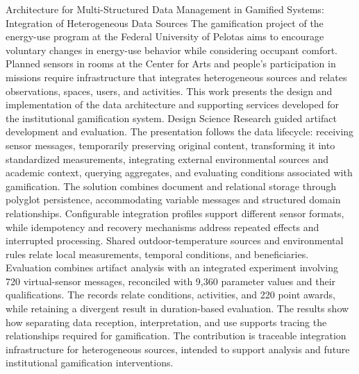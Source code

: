 \documentclass[tcc,capa]{texufpel}
\begin{document}
\begin{englishabstract}{Architecture for Multi-Structured Data Management in Gamified Systems: Integration of Heterogeneous Data Sources}
The gamification project of the energy-use program at the Federal University of Pelotas aims to encourage voluntary changes in energy-use behavior while considering occupant comfort. Planned sensors in rooms at the Center for Arts and people's participation in missions require infrastructure that integrates heterogeneous sources and relates observations, spaces, users, and activities. This work presents the design and implementation of the data architecture and supporting services developed for the institutional gamification system. Design Science Research guided artifact development and evaluation. The presentation follows the data lifecycle: receiving sensor messages, temporarily preserving original content, transforming it into standardized measurements, integrating external environmental sources and academic context, querying aggregates, and evaluating conditions associated with gamification. The solution combines document and relational storage through polyglot persistence, accommodating variable messages and structured domain relationships. Configurable integration profiles support different sensor formats, while idempotency and recovery mechanisms address repeated effects and interrupted processing. Shared outdoor-temperature sources and environmental rules relate local measurements, temporal conditions, and beneficiaries. Evaluation combines artifact analysis with an integrated experiment involving 720 virtual-sensor messages, reconciled with 9,360 parameter values and their qualifications. The records relate conditions, activities, and 220 point awards, while retaining a divergent result in duration-based evaluation. The results show how separating data reception, interpretation, and use supports tracing the relationships required for gamification. The contribution is traceable integration infrastructure for heterogeneous sources, intended to support analysis and future institutional gamification interventions.
\end{englishabstract}
\end{document}
